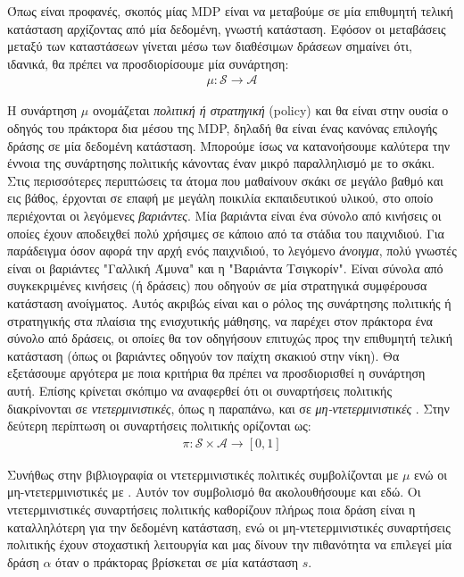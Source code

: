 \documentclass[11pt]{article} %
\numberwithin{equation}{subsection}
\begin{document}
Όπως είναι προφανές, σκοπός μίας MDP είναι να μεταβούμε σε μία επιθυμητή τελική κατάσταση αρχίζοντας από μία δεδομένη, γνωστή κατάσταση. Εφόσον οι μεταβάσεις μεταξύ των καταστάσεων γίνεται μέσω των διαθέσιμων δράσεων σημαίνει ότι, ιδανικά, θα πρέπει να προσδιορίσουμε μία συνάρτηση:
\begin{align*}
\mathcal{\mu} : \mathcal{S} \rightarrow \mathcal{A}
\end{align*}

Η συνάρτηση $\mathcal{\mu}$ ονομάζεται \textit{πολιτική ή στρατηγική} (policy) και θα είναι στην ουσία ο οδηγός του πράκτορα δια μέσου της MDP, δηλαδή θα είναι ένας κανόνας επιλογής δράσης σε μία δεδομένη κατάσταση. Μπορούμε ίσως να κατανοήσουμε καλύτερα την έννοια της συνάρτησης πολιτικής κάνοντας έναν μικρό παραλληλισμό με το σκάκι. Στις περισσότερες περιπτώσεις τα άτομα που μαθαίνουν σκάκι σε μεγάλο βαθμό και εις βάθος, έρχονται σε επαφή με μεγάλη ποικιλία εκπαιδευτικού υλικού, στο οποίο περιέχονται οι λεγόμενες \textit{βαριάντες}. Μία βαριάντα είναι ένα σύνολο από κινήσεις οι οποίες έχουν αποδειχθεί πολύ χρήσιμες σε κάποιο από τα στάδια του παιχνιδιού. Για παράδειγμα όσον αφορά την αρχή ενός παιχνιδιού, το λεγόμενο \textit{άνοιγμα}, πολύ γνωστές είναι οι βαριάντες "Γαλλική Άμυνα" και η "Βαριάντα Τσιγκορίν". Είναι σύνολα από συγκεκριμένες κινήσεις (ή δράσεις) που οδηγούν σε μία στρατηγικά συμφέρουσα κατάσταση ανοίγματος. Αυτός ακριβώς είναι και ο ρόλος της συνάρτησης πολιτικής ή στρατηγικής στα πλαίσια της ενισχυτικής μάθησης, να παρέχει στον πράκτορα ένα σύνολο από δράσεις, οι οποίες θα τον οδηγήσουν επιτυχώς προς την επιθυμητή τελική κατάσταση (όπως οι βαριάντες οδηγούν τον παίχτη σκακιού στην νίκη). Θα εξετάσουμε αργότερα με ποια κριτήρια θα πρέπει να προσδιορισθεί η συνάρτηση αυτή. Επίσης κρίνεται σκόπιμο να αναφερθεί ότι οι συναρτήσεις πολιτικής διακρίνονται σε \textit{ντετερμινιστικές}, όπως η παραπάνω, και σε \textit{μη-ντετερμινιστικές} \cite{reinflearning}. Στην δεύτερη περίπτωση οι συναρτήσεις πολιτικής ορίζονται ως:
\begin{align*}
\mathcal{\pi} : \mathcal{S} \times \mathcal{A} \rightarrow [0,1]
\end{align*}

Συνήθως στην βιβλιογραφία οι ντετερμινιστικές πολιτικές συμβολίζονται με $\mu$ ενώ οι μη-ντετερμινιστικές με \pi. Αυτόν τον συμβολισμό θα ακολουθήσουμε και εδώ. Οι ντετερμινιστικές συναρτήσεις πολιτικής καθορίζουν πλήρως ποια δράση είναι η καταλληλότερη για την δεδομένη κατάσταση, ενώ οι μη-ντετερμινιστικές συναρτήσεις πολιτικής έχουν στοχαστική λειτουργία και μας δίνουν την πιθανότητα να επιλεγεί μία δράση $\alpha$ όταν ο πράκτορας βρίσκεται σε μία κατάσταση $s$.\\
\end{document}
